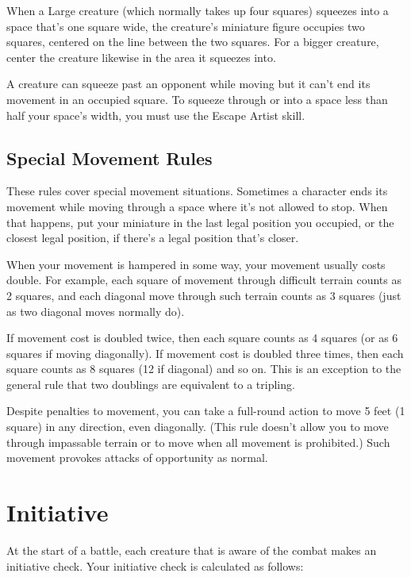 When a Large creature (which normally takes up four squares) squeezes into a space that's one square wide, the creature's miniature figure occupies two squares, centered on the line between the two squares. For a bigger creature, center the creature likewise in the area it squeezes into.

A creature can squeeze past an opponent while moving but it can't end its movement in an occupied square.  To squeeze through or into a space less than half your space's width, you must use the Escape Artist skill.

\subsection{Special Movement Rules}
These rules cover special movement situations.
 Sometimes a character ends its movement while moving through a space where it's not allowed to stop. When that happens, put your miniature in the last legal position you occupied, or the closest legal position, if there's a legal position that's closer.

 When your movement is hampered in some way, your movement usually costs double. For example, each square of movement through difficult terrain counts as 2 squares, and each diagonal move through such terrain counts as 3 squares (just as two diagonal moves normally do).

If movement cost is doubled twice, then each square counts as 4 squares (or as 6 squares if moving diagonally). If movement cost is doubled three times, then each square counts as 8 squares (12 if diagonal) and so on. This is an exception to the general rule that two doublings are equivalent to a tripling.

 Despite penalties to movement, you can take a full-round action to move 5 feet (1 square) in any direction, even diagonally. (This rule doesn't allow you to move through impassable terrain or to move when all movement is prohibited.) Such movement provokes attacks of opportunity as normal.

\section{Initiative}

At the start of a battle, each creature that is aware of the combat makes an initiative check. Your initiative check is calculated as follows:

